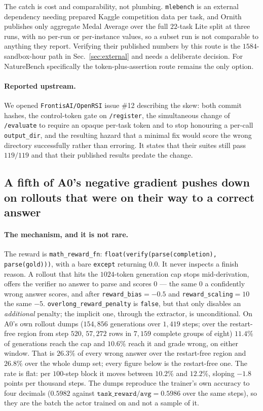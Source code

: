 The catch is cost and comparability, not plumbing. \texttt{mlebench} is an external
dependency needing prepared Kaggle competition data per task, and Ornith publishes only
aggregate Medal Average over the full $22$-task Lite split at three runs, with no per-run or
per-instance values, so a subset run is not comparable to anything they report. Verifying
their published numbers by this route is the $1584$-sandbox-hour path in
Sec.~\ref{sec:external} and needs a deliberate decision. For NatureBench specifically the
token-plus-assertion route remains the only option.

\paragraph{Reported upstream.} We opened
\texttt{FrontisAI/OpenRSI} issue \#12 describing the skew: both commit hashes, the
control-token gate on \texttt{/register}, the simultaneous change of \texttt{/evaluate} to
require an opaque per-task token and to stop honouring a per-call \texttt{output\_dir}, and
the resulting hazard that a minimal fix would score the wrong directory successfully rather
than erroring. It states that their suites still pass $119/119$ and that their published
results predate the change.

\subsection{A fifth of A0's negative gradient pushes down on rollouts that were on
their way to a correct answer}
\label{sec:truncation}

\paragraph{The mechanism, and it is not rare.} The reward is
\texttt{math\_reward\_fn}: \texttt{float(verify(parse(completion), parse(gold)))}, with a
bare \texttt{except} returning $0.0$. It never inspects a finish reason. A rollout that hits
the $1024$-token generation cap stops mid-derivation, offers the verifier no answer to parse
and scores $0$ --- the same $0$ a confidently wrong answer scores, and after
\texttt{reward\_bias}$=-0.5$ and \texttt{reward\_scaling}$=10$ the same $-5$.
\texttt{overlong\_reward\_penalty} is \texttt{false}, but that only disables an
\emph{additional} penalty; the implicit one, through the extractor, is unconditional. On A0's
own rollout dumps ($154{,}856$ generations over $1{,}419$ steps; over the restart-free region
from step $520$, $57{,}272$ rows in $7{,}159$ complete groups of eight) $\mathbf{11.4\%}$ of
generations reach the cap and $10.6\%$ reach it and grade wrong, on either window. That is
$\mathbf{26.3\%}$ of every wrong answer over the restart-free region and $26.8\%$ over the
whole dump set; every figure below is the restart-free one. The rate is flat: per $100$-step block it moves between
$10.2\%$ and $12.2\%$, sloping $-1.8$ points per thousand steps. The dumps reproduce the
trainer's own accuracy to four decimals ($0.5982$ against $\texttt{task\_reward/avg}=0.5986$
over the same steps), so they are the batch the actor trained on and not a sample of it.

